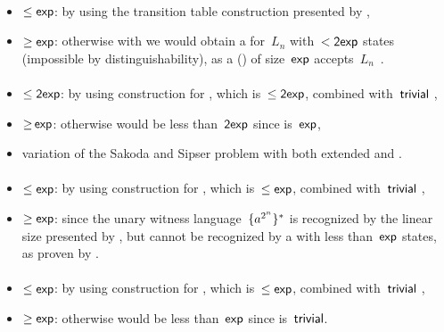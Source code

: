 \paragraph{\ODLA{}\tto\ODFA}\label{cost:1DLAto1DFA}
\begin{itemize}
	\item $\le\Cexp$: by using the transition table construction presented by ,
	\item $\ge\Cexp$: otherwise with \hyperref[cost:1DLAto1DFA]{\ODLA{}\tto\ODFA} we would obtain a \ODFA for~$L_n$ with~$<\Cdexp$ states (impossible by distinguishability), as a \ODLA (\TDFA) of size~$\Cexp$ accepts~$L_n$~\cite{PigPis14}.
\end{itemize}
\paragraph{\OLA{}\tto\ODLA}
\begin{itemize}
	\item $\le\Cdexp$: by using construction for \hyperref[cost:1LAto1DFA]{\OLA{}\tto\ODFA}, which is~$\le\Cdexp$, combined with~$\Ctriv$ \ODFA{}\tto\ODLA,
	\item $\ge\hspacingfix{-1pt}\Cexp$: otherwise \hyperref[cost:1LAto1DFA]{\OLA{}\tto\ODFA} would be less than~$\Cdexp$ since \ODLA{}\tto\ODFA is~$\Cexp$,
	\item variation of the Sakoda and Sipser problem with both extended \TNFA and \TDFA.
\end{itemize}
\paragraph{\ODLA{}\tto\TNFA}\label{cost:1DLAto2NFA}
\begin{itemize}
	\item $\le\Cexp$: by using construction for \hyperref[cost:1DLAto1DFA]{\ODLA{}\tto\ODFA}, which is~$\le\Cexp$, combined with~$\Ctriv$ \ODFA{}\tto\TNFA,
	\item $\ge\Cexp$: since the unary witness language~$\set{a^{2^n}}\star$ is recognized by the linear size \ODLA presented by , but cannot be recognized by a \TNFA with less than~$\Cexp$ states, as proven by .
\end{itemize}
\paragraph{\ODLA{}\tto\ONFA}
\begin{itemize}
	\item $\le\Cexp$: by using construction for \hyperref[cost:1DLAto1DFA]{\ODLA{}\tto\ODFA}, which is~$\le\Cexp$, combined with~$\Ctriv$ \ODFA{}\tto\ONFA,
	\item $\ge\Cexp$: otherwise \hyperref[cost:1DLAto2NFA]{\ODLA{}\tto\TNFA} would be less than~$\Cexp$ since \ONFA{}\tto\TNFA is~$\Ctriv$.
\end{itemize}

